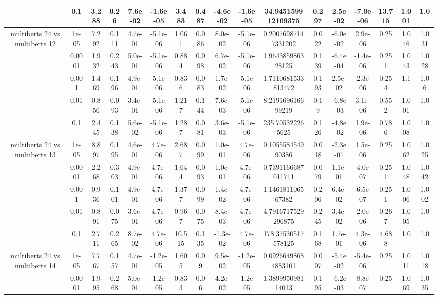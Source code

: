 \begin{tabular}{|c|c|c|c|c|c|c|c|c|c|c|c|c|c|c|c|c|}
 & 0.1 & 3.288 & 0.26 & 7.6e-02 & -1.6e-05 & 3.483 & 0.487 & -4.6e-02 & -1.6e-05 & 34.945159912109375 & 0.297 & 2.5e-02 & -7.0e-06 & 13.715 & 1.001 & 1.0 \\
\hline
\multirow{5}{*}{multiberts 24 vs multiberts 12} & 1e-05 & 7.292 & 0.111 & 4.7e-01 & -5.1e-06 & 1.061 & 0.086 & 8.0e-02 & -5.1e-06 & 0.20076987147331202 & 0.022 & -6.0e-02 & 2.9e-06 & 0.25 & 1.046 & 1.031 \\
 & 0.0001 & 1.932 & 0.243 & 5.0e-01 & -5.1e-06 & 0.884 & 0.098 & 6.7e-02 & -5.1e-06 & 1.964385986328125 & 0.139 & -6.4e-04 & -1.4e-06 & 0.251 & 1.043 & 1.028 \\
 & 0.001 & 1.469 & 0.196 & 4.9e-01 & -5.1e-06 & 0.836 & 0.083 & 1.7e-02 & -5.1e-06 & 1.7110681533813472 & 0.193 & 2.5e-02 & -2.3e-06 & 0.254 & 1.1 & 1.06 \\
 & 0.01 & 0.856 & 0.093 & 3.4e-01 & -5.1e-06 & 1.217 & 0.144 & 7.6e-03 & -5.1e-06 & 8.219169616699219 & 0.19 & -6.8e-03 & 3.1e-06 & 0.552 & 1.001 & 1.0 \\
 & 0.1 & 2.445 & 0.138 & 5.6e-02 & -5.1e-06 & 1.287 & 0.081 & 3.6e-03 & -5.1e-06 & 235.705322265625 & 0.126 & -4.8e-02 & 1.9e-06 & 0.786 & 1.008 & 1.0 \\
\hline
\multirow{5}{*}{multiberts 24 vs multiberts 13} & 1e-05 & 8.897 & 0.195 & 4.6e-01 & 4.7e-06 & 2.687 & 0.099 & 1.0e-01 & 4.7e-06 & 0.105558454990386 & 0.018 & -2.3e-01 & 1.5e-06 & 0.25 & 1.062 & 1.025 \\
 & 0.0001 & 2.268 & 0.303 & 4.9e-01 & 4.7e-06 & 1.644 & 0.093 & 1.0e-01 & 4.7e-06 & 0.7391166687011711 & 0.079 & 1.1e-01 & -4.0e-07 & 0.251 & 1.048 & 1.042 \\
 & 0.001 & 0.936 & 0.101 & 4.9e-01 & 4.7e-06 & 1.377 & 0.099 & 1.4e-02 & 4.7e-06 & 1.146181106567382 & 0.206 & 6.4e-02 & -6.5e-07 & 0.251 & 1.006 & 1.002 \\
 & 0.01 & 0.891 & 0.075 & 3.6e-01 & 4.7e-06 & 0.967 & 0.075 & 8.4e-03 & 4.7e-06 & 4.7916717529296875 & 0.245 & 3.4e-02 & -2.0e-06 & 0.267 & 1.005 & 1.0 \\
 & 0.1 & 2.711 & 0.265 & 8.7e-02 & 4.7e-06 & 10.515 & 0.135 & -1.3e-02 & 4.7e-06 & 178.37530517578125 & 0.168 & 1.7e-01 & 4.3e-06 & 4.688 & 1.0 & 1.0 \\
\hline
\multirow{5}{*}{multiberts 24 vs multiberts 14} & 1e-05 & 7.767 & 0.157 & 4.7e-01 & -1.2e-05 & 1.605 & 0.09 & 9.5e-02 & -1.2e-05 & 0.09266498684883101 & 0.007 & -5.4e-02 & -5.4e-06 & 0.25 & 1.011 & 1.018 \\
 & 0.0001 & 1.995 & 0.268 & 5.0e-01 & -1.2e-05 & 0.833 & 0.06 & 4.2e-02 & -1.2e-05 & 1.389995098114013 & 0.195 & -6.2e-03 & -8.8e-07 & 0.25 & 1.069 & 1.035 \\

\end{tabular}
